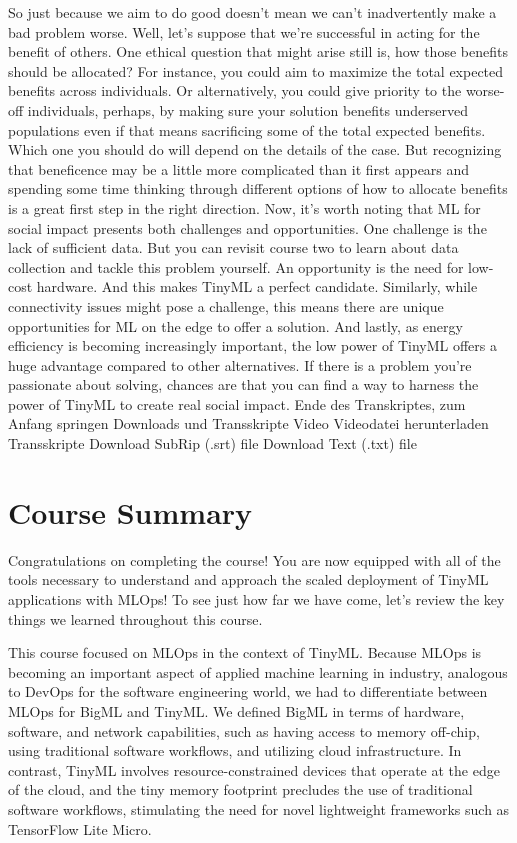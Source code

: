 {{{{{{{{    So just because we aim to do good doesn't mean we can't inadvertently
    make a bad problem worse.
    Well, let's suppose that we're successful in acting
    for the benefit of others.
    One ethical question that might arise still
    is, how those benefits should be allocated?
    For instance, you could aim to maximize the total expected benefits
    across individuals.
    Or alternatively, you could give priority to the worse-off individuals,
    perhaps, by making sure your solution benefits underserved populations
    even if that means sacrificing some of the total expected benefits.
    Which one you should do will depend on the details of the case.
    But recognizing that beneficence may be a little more complicated than it first
    appears and spending some time thinking through different options
    of how to allocate benefits is a great first step in the right direction.
    Now, it's worth noting that ML for social impact
    presents both challenges and opportunities.
    One challenge is the lack of sufficient data.
    But you can revisit course two to learn about data collection
    and tackle this problem yourself.
    An opportunity is the need for low-cost hardware.
    And this makes TinyML a perfect candidate.
    Similarly, while connectivity issues might pose a challenge,
    this means there are unique opportunities
    for ML on the edge to offer a solution.
    And lastly, as energy efficiency is becoming increasingly important,
    the low power of TinyML offers a huge advantage
    compared to other alternatives.
    If there is a problem you're passionate about solving,
    chances are that you can find a way to harness the power of TinyML
    to create real social impact.
    Ende des Transkriptes, zum Anfang springen
    Downloads und Transskripte
    Video
    Videodatei herunterladen
    Transskripte
    Download SubRip (.srt) file
    Download Text (.txt) file  
 

 
\section{Course Summary}

    Congratulations on completing the course! You are now equipped with all of the tools necessary to understand and approach the scaled deployment of TinyML applications with MLOps! To see just how far we have come, let’s review the key things we learned throughout this course.
    
    This course focused on MLOps in the context of TinyML. Because MLOps is becoming an important aspect of applied machine learning in industry, analogous to DevOps for the software engineering world, we had to differentiate between MLOps for BigML and TinyML. We defined BigML in terms of hardware, software, and network capabilities, such as having access to memory off-chip, using traditional software workflows, and utilizing cloud infrastructure. In contrast, TinyML involves resource-constrained devices that operate at the edge of the cloud, and the tiny memory footprint precludes the use of traditional software workflows, stimulating the need for novel lightweight frameworks such as TensorFlow Lite Micro.
    
}}}}}}}}
